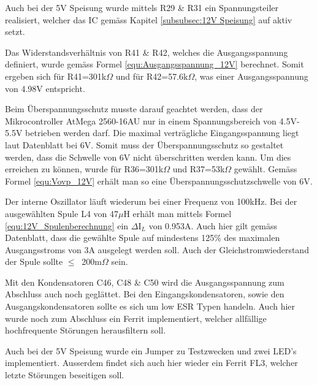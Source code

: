 Auch bei der 5V Speisung wurde mittels R29 \& R31 ein Spannungsteiler realisiert, welcher das IC gemäss Kapitel \ref{subsubsec:12V Speisung} auf aktiv setzt.

Das Widerstandsverhältnis von R41 \& R42, welches die Ausgangsspannung definiert, wurde gemäss Formel \ref{equ:Ausgangsspannung_12V} berechnet. Somit ergeben sich für R41=301k$\Omega$ und für R42=57.6k$\Omega$, was einer Ausgangsspannung von 4.98V entspricht. \cite[S.10]{monolithic_power_systems_mp24943_2011} 

Beim Überspannungsschutz musste darauf geachtet werden, dass der Mikrocontroller AtMega 2560-16AU nur in einem Spannungsbereich von 4.5V-5.5V betrieben werden darf. Die maximal verträgliche Eingangsspannung liegt laut Datenblatt bei 6V. Somit muss der Überspannungsschutz so gestaltet werden, dass die Schwelle von 6V nicht überschritten werden kann. Um dies erreichen zu können, wurde für R36=301k$\Omega$ und R37=53k$\Omega$ gewählt. Gemäss Formel \ref{equ:Vovp_12V} erhält man so eine Überspannungsschutzschwelle von 6V. \cite[S.1]{atmel_atmel_2014} \cite[S.10]{monolithic_power_systems_mp24943_2011}

Der interne Oszillator läuft wiederum bei einer Frequenz von 100kHz. Bei der ausgewählten Spule L4 von 47$\mu$H erhält man mittels Formel \ref{equ:12V_Spulenberechnung} ein $\Delta$I$_{L}$ von 0.953A. Auch hier gilt gemäss Datenblatt, dass die gewählte Spule auf mindestens 125\% des maximalen Ausgangsstroms von 3A ausgelegt werden soll. Auch der Gleichstromwiederstand der Spule sollte $ \leq \ $ 200m$\Omega$  sein. \cite[S.3]{monolithic_power_systems_mp24943_2011} \cite[S.10]{monolithic_power_systems_mp24943_2011} 

Mit den Kondensatoren C46, C48 \& C50 wird die Ausgangsspannung zum Abschluss auch noch geglättet. Bei den Eingangskondensatoren, sowie den Ausgangskondensatoren sollte es sich um low ESR Typen handeln. Auch hier wurde noch zum Abschluss ein Ferrit implementiert, welcher allfällige hochfrequente Störungen herausfiltern soll.

Auch bei der 5V Speisung wurde ein Jumper zu Testzwecken und zwei LED's implementiert. Ausserdem findet sich auch hier wieder ein Ferrit FL3, welcher letzte Störungen beseitigen soll. 


